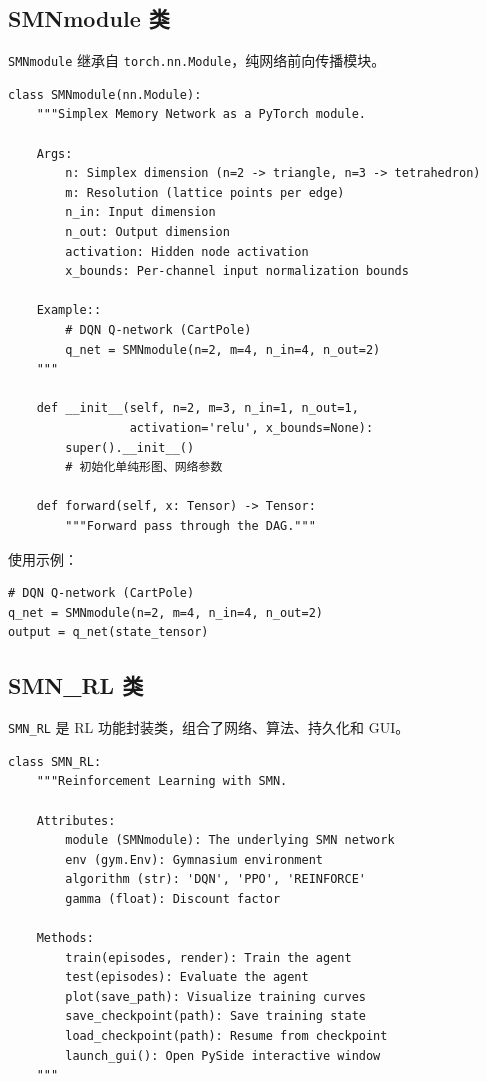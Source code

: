 \documentclass[11pt]{ctexart}
\begin{document}
\subsection{SMNmodule 类}

\texttt{SMNmodule} 继承自 \texttt{torch.nn.Module}，纯网络前向传播模块。

\begin{framed}
\begin{verbatim}
class SMNmodule(nn.Module):
    """Simplex Memory Network as a PyTorch module.

    Args:
        n: Simplex dimension (n=2 -> triangle, n=3 -> tetrahedron)
        m: Resolution (lattice points per edge)
        n_in: Input dimension
        n_out: Output dimension
        activation: Hidden node activation
        x_bounds: Per-channel input normalization bounds

    Example::
        # DQN Q-network (CartPole)
        q_net = SMNmodule(n=2, m=4, n_in=4, n_out=2)
    """

    def __init__(self, n=2, m=3, n_in=1, n_out=1,
                 activation='relu', x_bounds=None):
        super().__init__()
        # 初始化单纯形图、网络参数

    def forward(self, x: Tensor) -> Tensor:
        """Forward pass through the DAG."""
\end{verbatim}
\end{framed}

使用示例：
\begin{framed}
\begin{verbatim}
# DQN Q-network (CartPole)
q_net = SMNmodule(n=2, m=4, n_in=4, n_out=2)
output = q_net(state_tensor)
\end{verbatim}
\end{framed}

\subsection{SMN\_RL 类}

\texttt{SMN\_RL} 是 RL 功能封装类，组合了网络、算法、持久化和 GUI。

\begin{framed}
\begin{verbatim}
class SMN_RL:
    """Reinforcement Learning with SMN.

    Attributes:
        module (SMNmodule): The underlying SMN network
        env (gym.Env): Gymnasium environment
        algorithm (str): 'DQN', 'PPO', 'REINFORCE'
        gamma (float): Discount factor

    Methods:
        train(episodes, render): Train the agent
        test(episodes): Evaluate the agent
        plot(save_path): Visualize training curves
        save_checkpoint(path): Save training state
        load_checkpoint(path): Resume from checkpoint
        launch_gui(): Open PySide interactive window
    """
\end{verbatim}
\end{framed}
\end{document}
